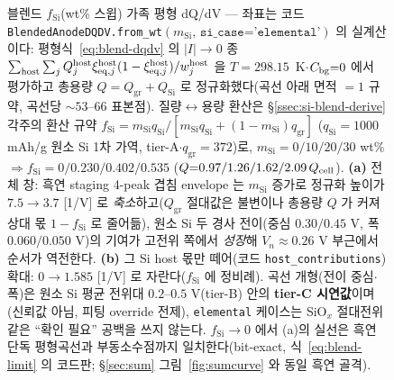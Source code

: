 \begin{figure}[t]
\caption{블렌드 $f_\mathrm{Si}$(wt\% 스윕) 가족 평형 dQ/dV --- 좌표는 코드
\texttt{BlendedAnodeDQDV.from\_wt}$(m_\mathrm{Si},\,\texttt{si\_case='elemental'})$ 의 실계산이다:
평형식~\eqref{eq:blend-dqdv} 의 $|I|\!\to\!0$ 종
$\sum_{\mathrm{host}}\sum_j Q_j^\mathrm{host}\xi_{\mathrm{eq},j}^\mathrm{host}(1-\xi_{\mathrm{eq},j}^\mathrm{host})/w_j^\mathrm{host}$
을 $T{=}298.15$~K$\cdot$$C_{\mathrm{bg}}{=}0$ 에서 평가하고 총용량 $Q{=}Q_\mathrm{gr}{+}Q_\mathrm{Si}$ 로
정규화했다(곡선 아래 면적 $=1$ 규약, 곡선당 $\sim$$53$--$66$ 표본점). 질량$\leftrightarrow$용량 환산은
§\ref{ssec:si-blend-derive} 각주의 환산 규약
$f_\mathrm{Si}=m_\mathrm{Si}q_\mathrm{Si}/[m_\mathrm{Si}q_\mathrm{Si}+(1{-}m_\mathrm{Si})q_\mathrm{gr}]$
($q_\mathrm{Si}{=}1000$ mAh/g 원소 Si 1차 가역\cite{limthongkul2003}, tier-A$\cdot$$q_\mathrm{gr}{=}372$)로,
$m_\mathrm{Si}{=}0/10/20/30$ wt\% $\Rightarrow f_\mathrm{Si}{=}0/0.230/0.402/0.535$
($Q{=}0.97/1.26/1.62/2.09\,Q_{\mathrm{cell}}$). \textbf{(a)} 전체 창: 흑연 staging 4-peak 겹침 envelope 는
$m_\mathrm{Si}$ 증가로 정규화 높이가 $7.5\!\to\!3.7$ [1/V] 로 \emph{축소}하고($Q_\mathrm{gr}$ 절대값은
불변이나 총용량 $Q$ 가 커져 상대 몫 $1{-}f_\mathrm{Si}$ 로 줄어듦), 원소 Si 두 경사 전이(중심 $0.30/0.45$
V, 폭 $0.060/0.050$ V)의 기여가 고전위 쪽에서 \emph{성장}해 $V_n\!\approx\!0.26$ V 부근에서 순서가
역전한다. \textbf{(b)} 그 Si host 몫만 떼어(코드 \texttt{host\_contributions}) 확대: $0\!\to\!1.585$
[1/V] 로 자란다($f_\mathrm{Si}$ 에 정비례). 곡선 개형(전이 중심$\cdot$폭)은 원소 Si 평균 전위대
$0.2$--$0.5$ V\cite{obrovac_chevrier2014}(tier-B) 안의 \textbf{tier-C 시연값}이며(신뢰값 아님, 피팅
override 전제), \texttt{elemental} 케이스는 SiO$_x$ 절대전위 같은 ``확인 필요'' 공백을 쓰지 않는다.
$f_\mathrm{Si}\!\to\!0$ 에서 (a)의 실선은 흑연 단독 평형곡선과 부동소수점까지 일치한다(bit-exact,
식~\eqref{eq:blend-limit} 의 코드판; \S\ref{sec:sum} 그림~\ref{fig:sumcurve} 와 동일 흑연 골격).}
\label{fig:blend-family}
\end{figure}


